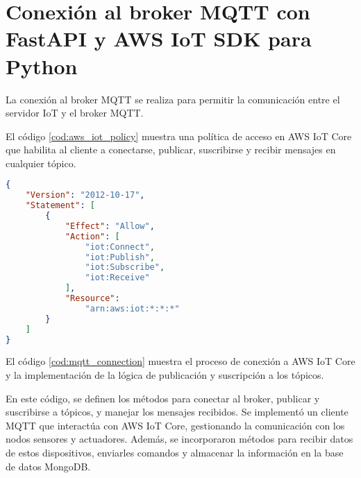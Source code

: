 \chapter{Conexión al broker MQTT con FastAPI y AWS IoT SDK para Python}
\label{AppendixE}

La conexión al broker MQTT se realiza para permitir la comunicación entre el
servidor IoT y el broker MQTT.

El código \ref{cod:aws_iot_policy} muestra una política de acceso en AWS IoT
Core que habilita al cliente a conectarse, publicar, suscribirse y recibir
mensajes en cualquier tópico.

\begin{lstlisting}[label=cod:aws_iot_policy,caption=Ejemplo de política de acceso en AWS IoT Core, language=JSON]
{
    "Version": "2012-10-17",
    "Statement": [
        {
            "Effect": "Allow",
            "Action": [
                "iot:Connect",
                "iot:Publish",
                "iot:Subscribe",
                "iot:Receive"
            ],
            "Resource": 
                "arn:aws:iot:*:*:*"
        }
    ]
}
\end{lstlisting}

El código \ref{cod:mqtt_connection} muestra el proceso de conexión a AWS IoT
Core y la implementación de la lógica de publicación y suscripción a los
tópicos.

En este código, se definen los métodos para conectar al broker, publicar y
suscribirse a tópicos, y manejar los mensajes recibidos. Se implementó un
cliente MQTT que interactúa con AWS IoT Core, gestionando la comunicación con
los nodos sensores y actuadores. Además, se incorporaron métodos para recibir
datos de estos dispositivos, enviarles comandos y almacenar la información en
la base de datos MongoDB.

